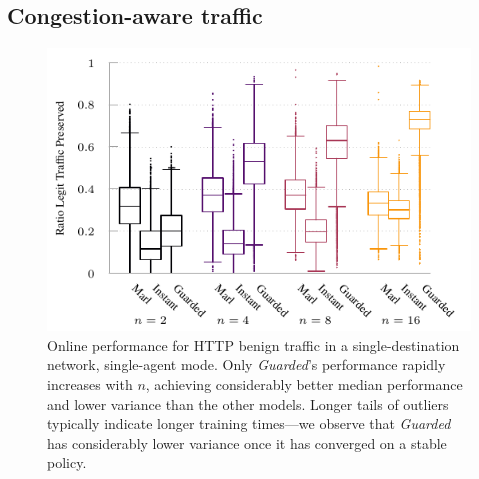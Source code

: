 \documentclass[10pt, times, conference, letterpaper]{IEEEtran}
\begin{document}
\subsection{Congestion-aware traffic}
%	
\begin{figure}
	\centering
	\includegraphics[width=0.8\linewidth]{../plots/tnsm-tcp-box-single}
	\vspace{-1em}
	\caption{
		Online performance for HTTP benign traffic in a single-destination network, single-agent mode.
		Only \emph{Guarded}'s performance rapidly increases with $n$, achieving considerably better median performance and lower variance than the other models.
		Longer tails of outliers typically indicate longer training times---we observe that \emph{Guarded} has considerably lower variance once it has converged on a stable policy.
		\vspace{-1em}
		\label{fig:tcp-tree-box}
	}
\end{figure}
%	
\end{document}
